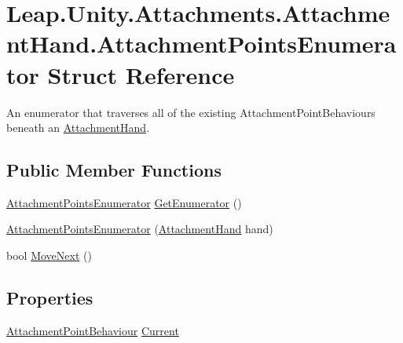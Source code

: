 \hypertarget{struct_leap_1_1_unity_1_1_attachments_1_1_attachment_hand_1_1_attachment_points_enumerator}{}\section{Leap.\+Unity.\+Attachments.\+Attachment\+Hand.\+Attachment\+Points\+Enumerator Struct Reference}
\label{struct_leap_1_1_unity_1_1_attachments_1_1_attachment_hand_1_1_attachment_points_enumerator}


An enumerator that traverses all of the existing Attachment\+Point\+Behaviours beneath an \mbox{\hyperlink{class_leap_1_1_unity_1_1_attachments_1_1_attachment_hand}{Attachment\+Hand}}.  


\subsection*{Public Member Functions}
\begin{DoxyCompactItemize}
\item 
\mbox{\hyperlink{struct_leap_1_1_unity_1_1_attachments_1_1_attachment_hand_1_1_attachment_points_enumerator}{Attachment\+Points\+Enumerator}} \mbox{\hyperlink{struct_leap_1_1_unity_1_1_attachments_1_1_attachment_hand_1_1_attachment_points_enumerator_ae56c04a878116f4a11ac951e2dd8961b}{Get\+Enumerator}} ()
\item 
\mbox{\hyperlink{struct_leap_1_1_unity_1_1_attachments_1_1_attachment_hand_1_1_attachment_points_enumerator_a21baee4894d501232749feb115899ebc}{Attachment\+Points\+Enumerator}} (\mbox{\hyperlink{class_leap_1_1_unity_1_1_attachments_1_1_attachment_hand}{Attachment\+Hand}} hand)
\item 
bool \mbox{\hyperlink{struct_leap_1_1_unity_1_1_attachments_1_1_attachment_hand_1_1_attachment_points_enumerator_a695bc493413b1dbcd3c04605db591f19}{Move\+Next}} ()
\end{DoxyCompactItemize}
\subsection*{Properties}
\begin{DoxyCompactItemize}
\item 
\mbox{\hyperlink{class_leap_1_1_unity_1_1_attachments_1_1_attachment_point_behaviour}{Attachment\+Point\+Behaviour}} \mbox{\hyperlink{struct_leap_1_1_unity_1_1_attachments_1_1_attachment_hand_1_1_attachment_points_enumerator_ab6e30358c523430d02f3a0fd2ab093f6}{Current}}
\end{DoxyCompactItemize}


